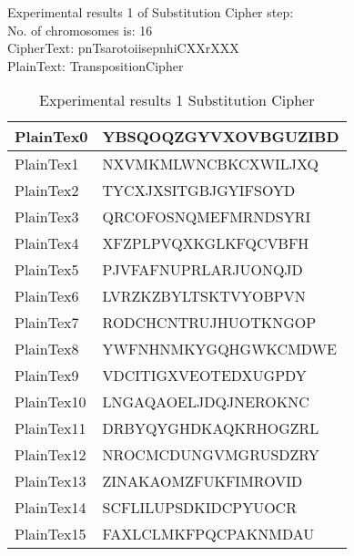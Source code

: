 \begin{tcolorbox}[breakable,notitle,boxrule=0pt,colback=blue!20,colframe=blue!20]
    {
    \textsf{Experimental results 1 of Substitution Cipher step:}\\
    \textsf{     No. of chromosomes is: 16}\\
    \textsf{     CipherText: pnTsarotoiisepnhiCXXrXXX}\\
    \textsf{     PlainText: TranspositionCipher}
    }
    \end{tcolorbox}
\begin{table}[H]
\centering
\begin{tabular}{l l}\hline
    PlainTex0 &YBSQOQZGYVXOVBGUZIBD\\ \hline
PlainTex1 &NXVMKMLWNCBKCXWILJXQ\\ \hline
PlainTex2 &TYCXJXSITGBJGYIFSOYD\\ \hline
PlainTex3 &QRCOFOSNQMEFMRNDSYRI\\ \hline
PlainTex4 &XFZPLPVQXKGLKFQCVBFH\\ \hline
PlainTex5 &PJVFAFNUPRLARJUONQJD\\ \hline
PlainTex6 &LVRZKZBYLTSKTVYOBPVN\\ \hline
PlainTex7 &RODCHCNTRUJHUOTKNGOP\\ \hline
PlainTex8 &YWFNHNMKYGQHGWKCMDWE\\ \hline
PlainTex9 &VDCITIGXVEOTEDXUGPDY\\ \hline
PlainTex10 &LNGAQAOELJDQJNEROKNC\\ \hline
PlainTex11 &DRBYQYGHDKAQKRHOGZRL\\ \hline
PlainTex12 &NROCMCDUNGVMGRUSDZRY\\ \hline
PlainTex13 &ZINAKAOMZFUKFIMROVID\\ \hline
PlainTex14 &SCFLILUPSDKIDCPYUOCR\\ \hline
PlainTex15 &FAXLCLMKFPQCPAKNMDAU\\ \hline
\end{tabular}
\caption{Experimental results 1 Substitution Cipher}

\end{table}


